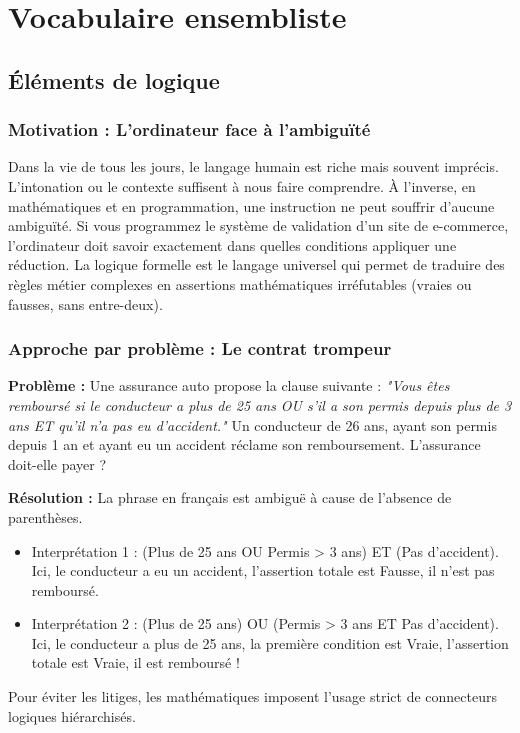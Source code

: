 \documentclass[12pt,a4paper]{report}
\begin{document}
\setcounter{chapter}{1} %
\chapter{Vocabulaire ensembliste}

\section{Éléments de logique}

\subsection{Motivation : L'ordinateur face à l'ambiguïté}
Dans la vie de tous les jours, le langage humain est riche mais souvent imprécis. L'intonation ou le contexte suffisent à nous faire comprendre. À l'inverse, en mathématiques et en programmation, une instruction ne peut souffrir d'aucune ambiguïté. Si vous programmez le système de validation d'un site de e-commerce, l'ordinateur doit savoir exactement dans quelles conditions appliquer une réduction. La logique formelle est le langage universel qui permet de traduire des règles métier complexes en assertions mathématiques irréfutables (vraies ou fausses, sans entre-deux).

\subsection{Approche par problème : Le contrat trompeur}
\textbf{Problème :} Une assurance auto propose la clause suivante : \textit{"Vous êtes remboursé si le conducteur a plus de 25 ans OU s'il a son permis depuis plus de 3 ans ET qu'il n'a pas eu d'accident."} 
Un conducteur de 26 ans, ayant son permis depuis 1 an et ayant eu un accident réclame son remboursement. L'assurance doit-elle payer ?

\textbf{Résolution :} La phrase en français est ambiguë à cause de l'absence de parenthèses. 
\begin{itemize}
    \item Interprétation 1 : (Plus de 25 ans OU Permis > 3 ans) ET (Pas d'accident). Ici, le conducteur a eu un accident, l'assertion totale est Fausse, il n'est pas remboursé.
    \item Interprétation 2 : (Plus de 25 ans) OU (Permis > 3 ans ET Pas d'accident). Ici, le conducteur a plus de 25 ans, la première condition est Vraie, l'assertion totale est Vraie, il est remboursé !
\end{itemize}
Pour éviter les litiges, les mathématiques imposent l'usage strict de connecteurs logiques hiérarchisés.
\end{document}
